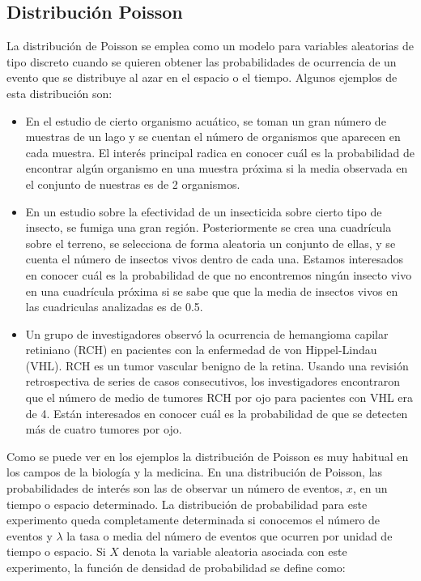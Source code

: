 \documentclass[
]{book}
\providecommand{\tightlist}{%
  \setlength{\itemsep}{0pt}\setlength{\parskip}{0pt}}
\begin{document}
\hypertarget{prob-poisson}{%
\subsection{Distribución Poisson}\label{prob-poisson}}

La distribución de Poisson se emplea como un modelo para variables aleatorias de tipo discreto cuando se quieren obtener las probabilidades de ocurrencia de un evento que se distribuye al azar en el espacio o el tiempo. Algunos ejemplos de esta distribución son:

\begin{itemize}
\tightlist
\item
  En el estudio de cierto organismo acuático, se toman un gran número de muestras de un lago y se cuentan el número de organismos que aparecen en cada muestra. El interés principal radica en conocer cuál es la probabilidad de encontrar algún organismo en una muestra próxima si la media observada en el conjunto de nuestras es de 2 organismos.
\item
  En un estudio sobre la efectividad de un insecticida sobre cierto tipo de insecto, se fumiga una gran región. Posteriormente se crea una cuadrícula sobre el terreno, se selecciona de forma aleatoria un conjunto de ellas, y se cuenta el número de insectos vivos dentro de cada una. Estamos interesados en conocer cuál es la probabilidad de que no encontremos ningún insecto vivo en una cuadrícula próxima si se sabe que que la media de insectos vivos en las cuadriculas analizadas es de 0.5.\\
\item
  Un grupo de investigadores observó la ocurrencia de hemangioma capilar retiniano (RCH) en pacientes con la enfermedad de von Hippel-Lindau (VHL). RCH es un tumor vascular benigno de la retina. Usando una revisión retrospectiva de series de casos consecutivos, los investigadores encontraron que el número de medio de tumores RCH por ojo para pacientes con VHL era de 4. Están interesados en conocer cuál es la probabilidad de que se detecten más de cuatro tumores por ojo.
\end{itemize}

Como se puede ver en los ejemplos la distribución de Poisson es muy habitual en los campos de la biología y la medicina. En una distribución de Poisson, las probabilidades de interés son las de observar un número de eventos, \(x\), en un tiempo o espacio determinado. La distribución de probabilidad para este experimento queda completamente determinada si conocemos el número de eventos y \(\lambda\) la tasa o media del número de eventos que ocurren por unidad de tiempo o espacio. Si \(X\) denota la variable aleatoria asociada con este experimento, la función de densidad de probabilidad se define como:
\end{document}
